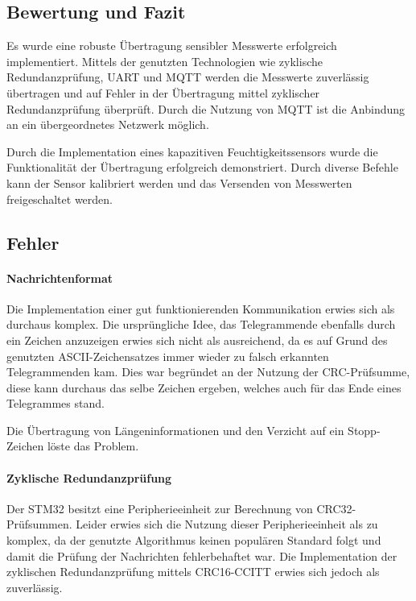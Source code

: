 \subsection{Bewertung und Fazit}
Es wurde eine robuste Übertragung sensibler Messwerte erfolgreich implementiert. Mittels der genutzten Technologien wie zyklische Redundanzprüfung, \ac{UART} und \ac{MQTT}
werden die Messwerte zuverlässig übertragen und auf Fehler in der Übertragung mittel zyklischer Redundanzprüfung überprüft. Durch die Nutzung von \ac{MQTT} ist die Anbindung an ein übergeordnetes 
Netzwerk möglich. 

\smallskip

Durch die Implementation eines kapazitiven Feuchtigkeitssensors wurde die Funktionalität der Übertragung erfolgreich demonstriert. Durch diverse Befehle kann der Sensor
kalibriert werden und das Versenden von Messwerten freigeschaltet werden.

\subsection{Fehler}
\paragraph{Nachrichtenformat}
Die Implementation einer gut funktionierenden Kommunikation erwies sich als durchaus komplex. Die ursprüngliche Idee, das Telegrammende ebenfalls durch ein Zeichen
anzuzeigen erwies sich nicht als ausreichend, da es auf Grund des genutzten \ac{ASCII}-Zeichensatzes immer wieder zu falsch erkannten Telegrammenden kam. Dies war 
begründet an der Nutzung der CRC-Prüfsumme, diese kann durchaus das selbe Zeichen ergeben, welches auch für das Ende eines Telegrammes stand. 

\smallskip

Die Übertragung von Längeninformationen und den Verzicht auf ein Stopp-Zeichen löste das Problem.

\paragraph{Zyklische Redundanzprüfung}
Der STM32 besitzt eine Peripherieeinheit zur Berechnung von CRC32-Prüfsummen. Leider erwies sich die Nutzung dieser Peripherieeinheit als zu komplex, da der genutzte
Algorithmus keinen populären Standard folgt und damit die Prüfung der Nachrichten fehlerbehaftet war. Die Implementation der zyklischen Redundanzprüfung mittels 
CRC16-CCITT erwies sich jedoch als zuverlässig.

